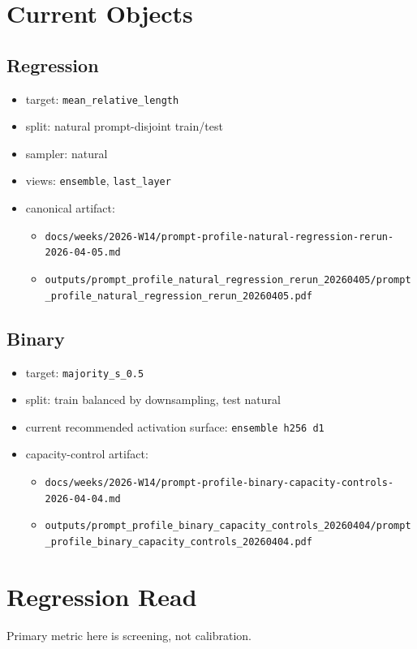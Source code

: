 \documentclass[11pt]{article}
\begin{document}
\section*{Current Objects}
\subsection*{Regression}
\begin{itemize}[leftmargin=1.5em]
\item target: \texttt{mean\_relative\_length}
\item split: natural prompt-disjoint train/test
\item sampler: natural
\item views: \texttt{ensemble}, \texttt{last\_layer}
\item canonical artifact:
  \begin{itemize}[leftmargin=1.5em]
  \item \texttt{docs/weeks/2026-W14/prompt-profile-natural-regression-rerun-2026-04-05.md}
  \item \texttt{outputs/prompt\_profile\_natural\_regression\_rerun\_20260405/prompt\_profile\_natural\_regression\_rerun\_20260405.pdf}
  \end{itemize}
\end{itemize}

\subsection*{Binary}
\begin{itemize}[leftmargin=1.5em]
\item target: \texttt{majority\_s\_0.5}
\item split: train balanced by downsampling, test natural
\item current recommended activation surface: \texttt{ensemble h256 d1}
\item capacity-control artifact:
  \begin{itemize}[leftmargin=1.5em]
  \item \texttt{docs/weeks/2026-W14/prompt-profile-binary-capacity-controls-2026-04-04.md}
  \item \texttt{outputs/prompt\_profile\_binary\_capacity\_controls\_20260404/prompt\_profile\_binary\_capacity\_controls\_20260404.pdf}
  \end{itemize}
\end{itemize}

\section*{Regression Read}
Primary metric here is screening, not calibration.
\end{document}
